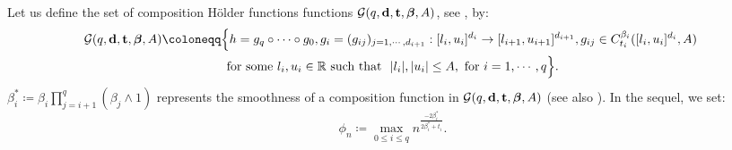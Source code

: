\documentclass[10pt,twoside]{article}
\numberwithin{equation}{section}
\newcommand{\R}{\ensuremath{\mathbb{R}}}
\begin{document}
\medskip

\noindent 
Let us define the set of composition H\"older functions functions $\mathcal{G}(q, \bold{d}, \bold{t}, \boldsymbol{\beta}, A)$, see \cite{schmidt2020nonparametric}, by: 
%
%
\begin{multline}\label{equa_compo_structured_function}
\mathcal{G}(q, \bold{d}, \bold{t}, \boldsymbol{\beta}, A) \coloneqq \Big\{h = g_q\circ \dots \circ g_0, g_i = (g_{ij})_{j=1,\cdots,d_{i+1}} : [l_i, u_i]^{d_i}
 \rightarrow [l_{i+1}, u_{i+1}]^{d_{i+1}}, g_{ij}\in C_{t_i}^{\beta_i}
 ([l_i, u_i]^{d_i}, A) ~ \\
        \text{for some } l_i, u_i \in \R \text{ such that } ~ |l_i|, |u_i| \leq A, \text{ for } i=1,\cdots,q \Big\}.
\end{multline}
%
%
$\beta_i^* \coloneqq \beta_i\prod_{j = i+1}^q(\beta_{j} \land 1)$ represents the smoothness of a composition function in $\mathcal{G}(q, \bold{d}, \bold{t}, \boldsymbol{\beta}, A)$ (see also \cite{juditsky2009nonparametric}).
%
In the sequel, we set:
%
\begin{equation}\label{def_phi_nalpha}
\phi_{n} \coloneqq  \underset{0\leq i \leq q}{\max} n^{ \frac{- 2\beta_i^* }{2\beta_i^* + t_i}   }.
\end{equation}

\medskip

\medskip
\end{document}
